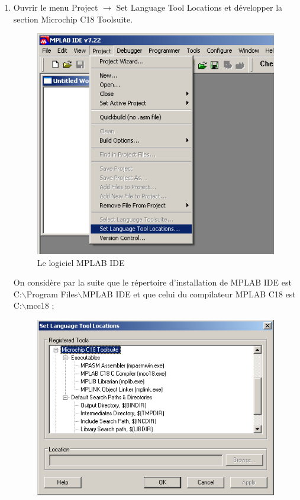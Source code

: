 \documentclass[a4paper]{article}
\begin{document}
\begin{enumerate}
	\item Ouvrir le menu \og{}Project\fg{} $\rightarrow$ \og{}Set Language Tool Locations\fg{} et développer la section \og{}Microchip C18 Toolsuite\fg{}.
		\begin{figure}[H]
			\centering
			\includegraphics[scale=0.75]{Images/Le_logiciel_MPLAB_IDE.png}
			\caption{Le logiciel MPLAB \ac{IDE}
				\label{Le_logiciel_MPLAB_IDE}}
		\end{figure}
		On considère par la suite que le répertoire d'installation de MPLAB \ac{IDE} est\\
		{\ttfamily C:$\backslash$Program Files$\backslash$MPLAB IDE} et que celui du compilateur MPLAB C18 est\\
		{\ttfamily C:$\backslash$mcc18} ;
		\begin{figure}[H]
			\centering
			\includegraphics[scale=0.75]{Images/Set_Language_Tool_Locations.png}

\end{figure}
\end{enumerate}
\end{document}
